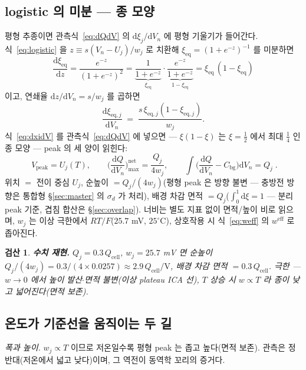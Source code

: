 \documentclass[11pt,a4paper]{article}
\newtheorem*{verifybox}{검산}
\newcommand{\dd}{\mathrm{d}}
\newcommand{\eff}{\mathrm{eff}}
\newcommand{\eq}{\mathrm{eq}}
\newcommand{\cell}{\mathrm{cell}}
\newcommand{\bg}{\mathrm{bg}}
\newcommand{\peak}{\mathrm{peak}}
\begin{document}
\subsection{logistic 의 미분 — 종 모양}
평형 추종이면 관측식~\eqref{eq:dQdV} 의 $\dd\xi_j/\dd V_n$ 에 평형 기울기가 들어간다. 식~\eqref{eq:logistic} 을 $z\equiv s(V_n-U_j)/w_j$ 로 치환해 $\xi_{\eq}=(1+e^{-z})^{-1}$ 를 미분하면
\begin{equation}
\frac{\dd\xi_{\eq}}{\dd z}
=\frac{e^{-z}}{(1+e^{-z})^{2}}
=\underbrace{\frac{1}{1+e^{-z}}}_{\xi_{\eq}}\cdot
\underbrace{\frac{e^{-z}}{1+e^{-z}}}_{1-\xi_{\eq}}
=\xi_{\eq}\,(1-\xi_{\eq})
\label{eq:belliden}
\end{equation}
이고, 연쇄율 $\dd z/\dd V_n=s/w_j$ 를 곱하면
\begin{equation}
\frac{\dd\xi_{\eq,j}}{\dd V_n}\;=\;\frac{s\,\xi_{\eq,j}(1-\xi_{\eq,j})}{w_j}.
\label{eq:dxidV}
\end{equation}
식~\eqref{eq:dxidV} 를 관측식~\eqref{eq:dQdV} 에 넣으면 — $\xi(1-\xi)$ 는 $\xi=\tfrac12$ 에서 최대 $\tfrac14$ 인 종 모양 — peak 의 세 양이 읽힌다:
\begin{equation}
\boxed{\;V_\peak=U_j(T),\qquad
\Big(\frac{\dd Q}{\dd V_n}\Big)^{\text{net}}_{\max}=\frac{Q_j}{4w_j},\qquad
\int\Big(\frac{\dd Q}{\dd V_n}-C_\bg\Big)\dd V_n=Q_j\;.}
\label{eq:eqpeak}
\end{equation}
위치 $=$ 전이 중심 $U_j$, 순높이 $=Q_j/(4w_j)$(평형 peak 은 방향 불변 — 충방전 방향은 통합형 \S\ref{sec:master} 의 $\sigma_d$ 가 처리), 배경 차감 면적 $=Q_j$($\int_0^1\dd\xi=1$ — 분리 peak 기준, 겹침 합산은 \S\ref{sec:overlap}). 너비는 별도 지표 없이 면적/높이 비로 읽으며, $w_j$ 는 이상 극한에서 $RT/F$($25.7$ mV, $25^\circ$C), 상호작용 시 식~\eqref{eq:weff} 의 $w^{\eff}$ 로 좁아진다.

\begin{verifybox}
\textbf{수치 재현.} $Q_j=0.3\,Q_\cell$, $w_j=25.7$ mV 면 순높이 $Q_j/(4w_j)=0.3/(4\times0.0257)\approx2.9\,Q_\cell/\mathrm V$, 배경 차감 면적 $=0.3\,Q_\cell$. 극한 — $w\to0$ 에서 높이 발산$\cdot$면적 불변(이상 plateau ICA 선), $T$ 상승 시 $w\propto T$ 라 종이 낮고 넓어진다(면적 보존).
\end{verifybox}

\subsection{온도가 기준선을 움직이는 두 길}
\emph{폭과 높이.} $w_j\propto T$ 이므로 저온일수록 평형 peak 는 좁고 높다(면적 보존). 관측은 정반대(저온에서 넓고 낮다)이며, 그 역전이 동역학 꼬리의 증거다.
\end{document}
